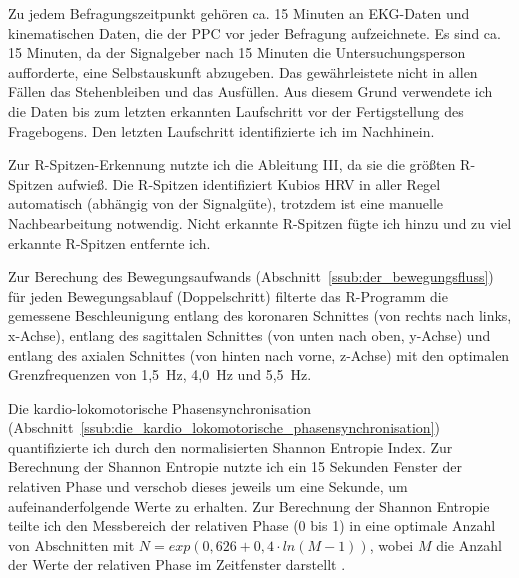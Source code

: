 Zu jedem Befragungszeitpunkt gehören ca. 15 Minuten an \ac{EKG}-Daten und kinematischen Daten, die der \ac{PPC} vor jeder Befragung aufzeichnete. Es sind ca. 15 Minuten, da der Signalgeber nach 15 Minuten die Untersuchungsperson aufforderte, eine Selbstauskunft abzugeben. Das gewährleistete nicht in allen Fällen das Stehenbleiben und das Ausfüllen. Aus diesem Grund verwendete ich die Daten bis zum letzten erkannten Laufschritt vor der Fertigstellung des Fragebogens. Den letzten Laufschritt identifizierte ich im Nachhinein. 

Zur R-Spitzen-Erkennung nutzte ich die Ableitung III, da sie die größten R-Spitzen aufwieß. Die R-Spitzen identifiziert Kubios HRV in aller Regel automatisch (abhängig von der Signalgüte), trotzdem ist eine manuelle Nachbearbeitung notwendig. Nicht erkannte R-Spitzen fügte ich hinzu und zu viel erkannte R-Spitzen entfernte ich. 

Zur Berechung des Bewegungsaufwands (Abschnitt~\ref{ssub:der_bewegungsfluss}) für jeden Bewegungsablauf (Doppelschritt) filterte das R-Programm die gemessene Beschleunigung entlang des koronaren Schnittes (von rechts nach links, x-Achse), entlang des sagittalen Schnittes (von unten nach oben, y-Achse) und entlang des axialen Schnittes (von hinten nach vorne, z-Achse) mit den optimalen Grenzfrequenzen von 1,5~Hz, 4,0~Hz und 5,5~Hz.

Die kardio-lokomotorische Phasensynchronisation (Abschnitt~\ref{ssub:die_kardio_lokomotorische_phasensynchronisation}) quantifizierte ich durch den normalisierten Shannon Entropie Index. Zur Berechnung der Shannon Entropie nutzte ich ein 15 Sekunden Fenster der relativen Phase und verschob dieses jeweils um eine Sekunde, um aufeinanderfolgende Werte zu erhalten. Zur Berechnung der Shannon Entropie teilte ich den Messbereich der relativen Phase (0 bis 1) in eine optimale Anzahl von Abschnitten mit $N = exp(0{,}626 + 0{,}4 \cdot ln(M-1))$, wobei $M$ die Anzahl der Werte der relativen Phase im Zeitfenster darstellt \citep[][S.~20]{Rosenblum2003}.

